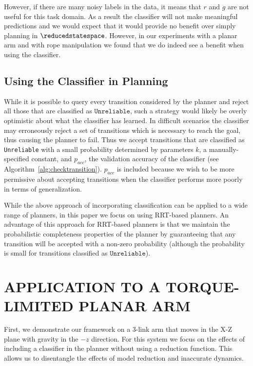 However, if there are many noisy labels in the data, it means that $r$ and $g$ are not useful for this task domain. As a result the classifier will not make meaningful predictions and we would expect that it would provide no benefit over simply planning in $\reducedstatespace$. However, in our experiments with a planar arm and with rope manipulation we found that we do indeed see a benefit when using the classifier.


\subsection{Using the Classifier in Planning}


While it is possible to query every transition considered by the planner and reject all those that are classified as $\texttt{Unreliable}$, such a strategy would likely be overly optimistic about what the classifier has learned. In difficult scenarios the classifier may erroneously reject a set of transitions which is necessary to reach the goal, thus causing the planner to fail. Thus we accept transitions that are classified as \texttt{Unreliable} with a small probability determined by parameters $k$, a manually-specified constant, and $p_{acc}$, the validation accuracy of the classifier (see  Algorithm~\ref{alg:checktransition}). $p_{acc}$ is included because we wish to be more permissive about accepting transitions when the classifier performs more poorly in terms of generalization.

While the above approach of incorporating classification can be applied to a wide range of planners, in this paper we focus on using RRT-based planners. An advantage of this approach for RRT-based planners is that we maintain the probabilistic completeness properties of the planner by guaranteeing that any transition will be accepted with a non-zero probability (although the probability is small for transitions classified as $\texttt{Unreliable}$).




\section{APPLICATION TO A TORQUE-LIMITED PLANAR ARM}



First, we demonstrate our framework on a 3-link arm that moves in the X-Z plane with gravity in the $-z$ direction. For this system we focus on the effects of including a classifier in the planner without using a reduction function. This allows us to disentangle the effects of model reduction and inaccurate dynamics. %

